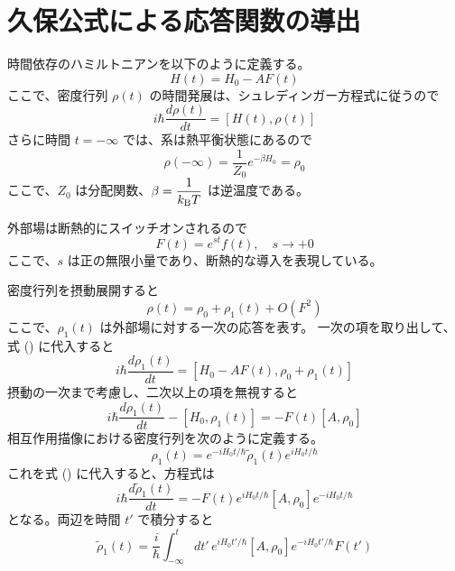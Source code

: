 \documentclass[11pt,a4j]{jreport}
\begin{document}
\section{久保公式による応答関数の導出}
時間依存のハミルトニアンを以下のように定義する。
\begin{equation}
  H(t) = H_0 - A F(t)
\end{equation}
ここで、密度行列 $\rho(t)$ の時間発展は、シュレディンガー方程式に従うので
\begin{equation}
  i\hbar \frac{d \rho(t)}{dt} = [H(t), \rho(t)] 
\end{equation}
さらに時間 $t = -\infty$ では、系は熱平衡状態にあるので
\begin{equation}
  \rho(-\infty) = \frac{1}{Z_0} e^{-\beta H_0} = \rho_0 
\end{equation}
ここで、$ Z_0 $ は分配関数、$ \beta = \dfrac{1}{k_{\text B} T} $ は逆温度である。\par
外部場は断熱的にスイッチオンされるので
\begin{equation}
  F(t) = e^{s t} f(t), \quad s \rightarrow +0 
\end{equation}
ここで、$ s $ は正の無限小量であり、断熱的な導入を表現している。\par
密度行列を摂動展開すると
\begin{equation}
  \rho(t) = \rho_0 + \rho_1(t) + O(F^2) 
\end{equation}
ここで、$ \rho_1(t)$ は外部場に対する一次の応答を表す。
一次の項を取り出して、式 () に代入すると  
\begin{equation}
  i\hbar \frac{d \rho_1(t)}{dt} = [H_0 - A F(t), \rho_0 + \rho_1(t)]
\end{equation}
摂動の一次まで考慮し、二次以上の項を無視すると  
\begin{equation}
  i\hbar \frac{d \rho_1(t)}{dt} - [H_0, \rho_1(t)] = - F(t) [A, \rho_0] 
\end{equation}
 相互作用描像における密度行列を次のように定義する。
\begin{equation}
  \rho_1(t) = e^{-i H_0 t / \hbar} \tilde{\rho}_1(t) e^{i H_0 t / \hbar}
\end{equation}
これを式 () に代入すると、方程式は
\begin{equation}
  i\hbar \frac{d \tilde{\rho}_1(t)}{dt} = - F(t) e^{i H_0 t / \hbar} [A, \rho_0] e^{-i H_0 t / \hbar} \label{eq:3.8}
\end{equation}
となる。両辺を時間 $ t' $ で積分すると
\begin{equation}
  \tilde{\rho}_1(t) = \frac{i}{\hbar} \int_{-\infty}^{t} dt' \, e^{i H_0 t' / \hbar} [A, \rho_0] e^{-i H_0 t' / \hbar} F(t') \label{eq:3.9}
\end{equation}
\end{document}
